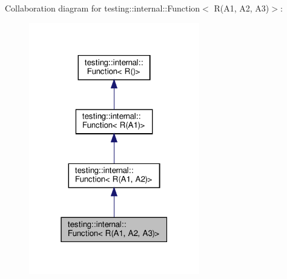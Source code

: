 Collaboration diagram for testing\+:\+:internal\+:\+:Function$<$ R(A1, A2, A3)$>$\+:
\nopagebreak
\begin{figure}[H]
\begin{center}
\leavevmode
\includegraphics[width=211pt]{structtesting_1_1internal_1_1_function_3_01_r_07_a1_00_01_a2_00_01_a3_08_4__coll__graph}
\end{center}
\end{figure}

